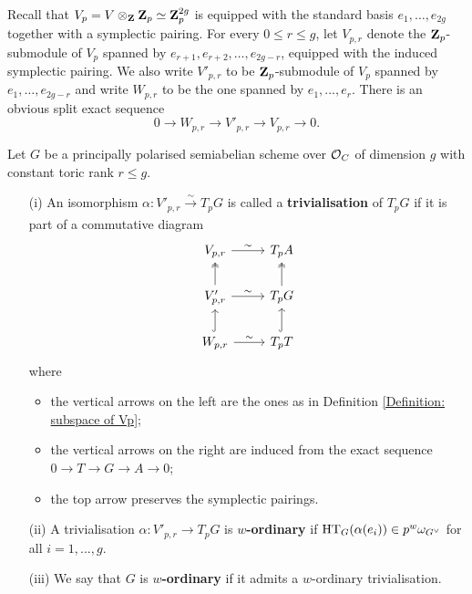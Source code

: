 \begin{Definition}\label{Definition: subspace of Vp}
Recall that $V_p=V\otimes_{\operatorname{\mathbf{Z}}} \operatorname{\mathbf{Z}}_p\simeq \operatorname{\mathbf{Z}}_p^{2g}$ is equipped with the standard basis $e_1, \ldots, e_{2g}$ together with a symplectic pairing. For every $0\leq r \leq g$, let $V_{p,r}$ denote the $\operatorname{\mathbf{Z}}_p$-submodule of $V_p$ spanned by $e_{r+1}, e_{r+2}, \ldots, e_{2g-r}$, equipped with the induced symplectic pairing. We also write $V'_{p,r}$ to be $\operatorname{\mathbf{Z}}_p$-submodule of $V_p$ spanned by $e_1, \ldots, e_{2g-r}$ and write $W_{p,r}$ to be the one spanned by $e_1, \ldots, e_r$. There is an obvious split exact sequence
$$0\rightarrow W_{p,r}\rightarrow V'_{p,r}\rightarrow V_{p,r}\rightarrow 0.$$
\end{Definition}

\begin{Definition}\label{Definition: w-ordinary semiabelian scheme with constant toric rank}
Let $G$ be a principally polarised semiabelian scheme over $\operatorname{\mathcal{O}}_C$ of dimension $g$ with constant toric rank $r \leq g$. \begin{enumerate}
    \item[(i)] An isomorphism $\alpha: V'_{p,r} \xrightarrow[]{\sim} T_p G$ is called a \textbf{trivialisation} of $T_p G$ if it is part of a commutative diagram \[
        \begin{tikzcd}
            V_{p,r}\arrow[r,"\sim"] & T_pA\\
            V'_{p,r} \arrow[r,"\sim"]\arrow[u, two heads] & T_pG\arrow[u, two heads]\\
            W_{p,r} \arrow[u, hook]\arrow[r,"\sim"] & T_p T\arrow[u, hook]
        \end{tikzcd}
        \] where \begin{itemize}
            \item the vertical arrows on the left are the ones as in Definition \ref{Definition: subspace of Vp};
            \item the vertical arrows on the right are induced from the exact sequence $0\rightarrow T\rightarrow G\rightarrow A\rightarrow 0$;
            \item the top arrow preserves the symplectic pairings.
        \end{itemize}
    \item[(ii)] A trivialisation $\alpha: V'_{p,r} \rightarrow T_p G$ is \textbf{$w$-ordinary} if $\operatorname{HT}_G(\alpha(e_i))\in p^w {\omega}_{G^{\vee}}$ for all $i=1, ..., g$. 
    \item[(iii)] We say that $G$ is \textbf{$w$-ordinary} if it admits a $w$-ordinary trivialisation. 
\end{enumerate}
\end{Definition}

